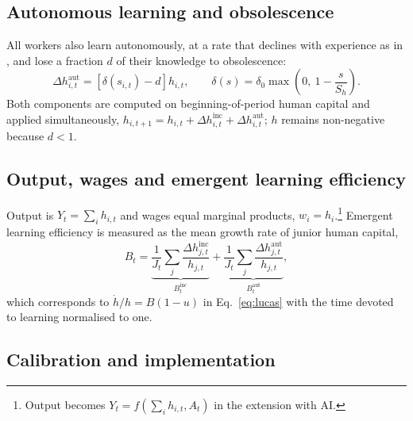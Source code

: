 \documentclass[preprint,12pt,authoryear]{elsarticle}
\begin{document}
\subsection{Autonomous learning and obsolescence}

All workers also learn autonomously, at a rate that declines with experience as in \citet{BenPorath1967}, and lose a fraction $d$ of their knowledge to obsolescence:
\begin{equation}\label{eq:aut}
\Delta h^{\mathrm{aut}}_{i,t} = \left[\delta(s_{i,t})-d\right] h_{i,t}, \qquad \delta(s) = \delta_0 \max\!\left(0,\ 1-\frac{s}{S_h}\right).
\end{equation}
Both components are computed on beginning-of-period human capital and applied simultaneously, $h_{i,t+1}=h_{i,t}+\Delta h^{\mathrm{inc}}_{i,t}+\Delta h^{\mathrm{aut}}_{i,t}$; $h$ remains non-negative because $d<1$.

\subsection{Output, wages and emergent learning efficiency}

Output is $Y_t=\sum_i h_{i,t}$ and wages equal marginal products, $w_i = h_i$.\footnote{Output becomes $Y_t = f(\sum_i h_{i,t}, A_t)$ in the extension with AI.} Emergent learning efficiency is measured as the mean growth rate of junior human capital,
\begin{equation}\label{eq:B}
B_t = \underbrace{\frac{1}{J_t}\sum_{j}\frac{\Delta h^{\mathrm{inc}}_{j,t}}{h_{j,t}}}_{B^{\mathrm{inc}}_t} + \underbrace{\frac{1}{J_t}\sum_{j}\frac{\Delta h^{\mathrm{aut}}_{j,t}}{h_{j,t}}}_{B^{\mathrm{aut}}_t},
\end{equation}
which corresponds to $\dot h/h = B(1-u)$ in Eq.~\eqref{eq:lucas} with the time devoted to learning normalised to one.

\subsection{Calibration and implementation}
\end{document}
